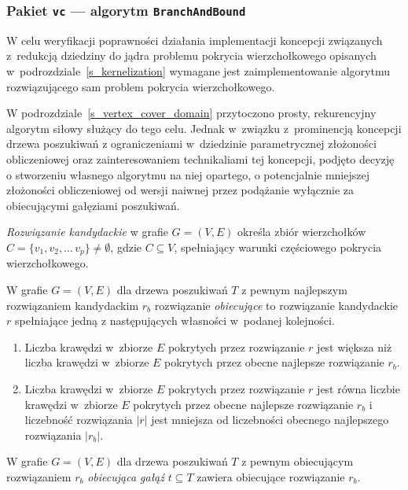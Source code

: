 \subsubsection{\textbf{Pakiet \texttt{vc} --- algorytm \texttt{BranchAndBound}}}
\label{ss_internals_bnb}
\par{
  W celu weryfikacji poprawności działania implementacji koncepcji związanych z~redukcją dziedziny do jądra problemu pokrycia wierzchołkowego opisanych w~podrozdziale~\ref{s_kernelization} wymagane jest zaimplementowanie algorytmu rozwiązującego sam problem pokrycia wierzchołkowego.

  W podrozdziale~\ref{s_vertex_cover_domain} przytoczono prosty, rekurencyjny algorytm siłowy służący do tego celu.
  Jednak w~związku z~prominencją koncepcji drzewa poszukiwań z ograniczeniami w~dziedzinie parametrycznej złożoności obliczeniowej oraz zainteresowaniem technikaliami tej koncepcji, podjęto decyzję o stworzeniu własnego algorytmu na niej opartego, o potencjalnie mniejszej złożoności obliczeniowej od wersji naiwnej przez podążanie wyłącznie za obiecującymi gałęziami poszukiwań.

  \begin{definition}
    \emph{Rozwiązanie kandydackie} w grafie $G=(V, E)$ określa zbiór wierzchołków $C=\{v_1, v_2, \ldots\, v_p\} \neq \emptyset$, gdzie $C \subseteq V$, spełniający warunki częściowego pokrycia wierzchołkowego.
  \end{definition}
  \begin{definition}
    W grafie $G=(V,E)$ dla drzewa poszukiwań $T$ z pewnym najlepszym rozwiązaniem kandydackim $r_b$ rozwiązanie \emph{obiecujące} to rozwiązanie kandydackie $r$ spełniające jedną z następujących własności w~podanej kolejności.
    \begin{enumerate}
      \item Liczba krawędzi w~zbiorze $E$ pokrytych przez rozwiązanie $r$ jest większa niż liczba krawędzi w~zbiorze $E$ pokrytych przez obecne najlepsze rozwiązanie $r_b$.
      \item Liczba krawędzi w~zbiorze $E$ pokrytych przez rozwiązanie $r$ jest równa liczbie krawędzi w~zbiorze $E$ pokrytych przez obecne najlepsze rozwiązanie $r_b$ i liczebność rozwiązania $|r|$ jest mniejsza od liczebności obecnego najlepszego rozwiązania $|r_b|$.
    \end{enumerate}
  \end{definition}
  \begin{definition}
     W grafie $G=(V, E)$ dla drzewa poszukiwań $T$ z pewnym obiecującym rozwiązaniem $r_b$ \emph{obiecująca gałąź} $t \subseteq T$ zawiera obiecujące rozwiązanie $r_b$.
  \end{definition}
}
